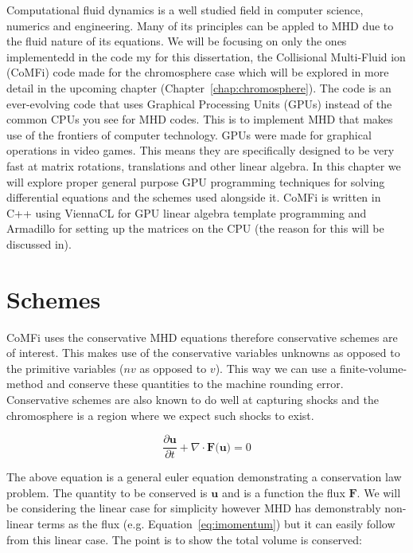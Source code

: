 \documentclass[12pt,upcase]{umlthesis}
\begin{document}
Computational fluid dynamics is a well studied field in computer science, numerics and engineering. Many of its principles can be appled to MHD due to the fluid nature of its equations. We will be focusing on only the ones implementedd in the code my for this dissertation, the Collisional Multi-Fluid ion (CoMFi) code made for the chromosphere case which will be explored in more detail in the upcoming chapter (Chapter~\ref{chap:chromosphere}). The code is an ever-evolving code that uses Graphical Processing Units (GPUs) instead of the common CPUs you see for MHD codes. This is to implement MHD that makes use of the frontiers of computer technology. GPUs were made for graphical operations in video games. This means they are specifically designed to be very fast at matrix rotations, translations and other linear algebra. In this chapter we will explore proper general purpose GPU programming techniques for solving differential equations and the schemes used alongside it. CoMFi is written in C++ using ViennaCL for GPU linear algebra template programming and Armadillo for setting up the matrices on the CPU (the reason for this will be discussed in).

\section{Schemes}\label{sec:schemes}

CoMFi uses the conservative MHD equations therefore conservative schemes are of interest. This makes use of the conservative variables unknowns as opposed to the primitive variables ($n v$ as opposed to $v$). This way we can use a finite-volume-method and conserve these quantities to the machine rounding error. Conservative schemes are also known to do well at capturing shocks and the chromosphere is a region where we expect such shocks to exist.

\begin{equation}\label{eq:geneuler}
	\frac{\partial \textbf{u}}{\partial t} + \nabla \cdot \textbf{F(u)} = 0
\end{equation}

The above equation is a general euler equation demonstrating a conservation law problem. The quantity to be conserved is $\textbf{u}$ and is a function the flux $\textbf{F}$. We will be considering the linear case for simplicity however MHD has demonstrably non-linear terms as the flux (e.g. Equation~\ref{eq:imomentum}) but it can easily follow from this linear case. The point is to show the total volume is conserved:
\end{document}
